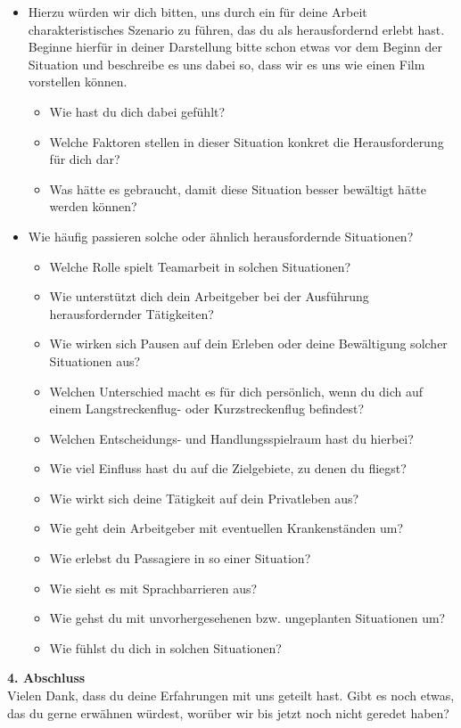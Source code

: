 \documentclass[12pt, a4paper]{article}
\begin{document}
\begin{tcolorbox}[
  breakable,
  colback=gray!10,
  colframe=black,
  arc=10pt,          %
  boxrule=0.5pt,
  left=6pt, right=6pt, top=6pt, bottom=6pt
]
\begin{itemize}
    \item  Hierzu würden wir dich bitten, uns durch ein für deine Arbeit charakteristisches
    Szenario zu führen, das du als herausfordernd erlebt hast. Beginne hierfür in deiner
    Darstellung bitte schon etwas vor dem Beginn der Situation und beschreibe es uns
    dabei so, dass wir es uns wie einen Film vorstellen können.
    \begin{itemize}
        \item Wie hast du dich dabei gefühlt?
        \item Welche Faktoren stellen in dieser Situation konkret die Herausforderung für
        dich dar?
        \item Was hätte es gebraucht, damit diese Situation besser bewältigt hätte werden
        können?
    \end{itemize}
    \item Wie häufig passieren solche oder ähnlich herausfordernde Situationen?
    \begin{itemize}
        \item Welche Rolle spielt Teamarbeit in solchen Situationen?
        \item Wie unterstützt dich dein Arbeitgeber bei der Ausführung herausfordernder
        Tätigkeiten?
        \item Wie wirken sich Pausen auf dein Erleben oder deine Bewältigung solcher
        Situationen aus?
        \item Welchen Unterschied macht es für dich persönlich, wenn du dich auf einem
        Langstreckenflug- oder Kurzstreckenflug befindest?
        \item Welchen Entscheidungs- und Handlungsspielraum hast du hierbei?
        \item Wie viel Einfluss hast du auf die Zielgebiete, zu denen du fliegst?
        \item Wie wirkt sich deine Tätigkeit auf dein Privatleben aus?
        \item Wie geht dein Arbeitgeber mit eventuellen Krankenständen um?
        \item Wie erlebst du Passagiere in so einer Situation?
        \item Wie sieht es mit Sprachbarrieren aus?
        \item Wie gehst du mit unvorhergesehenen bzw. ungeplanten Situationen um?
        \item Wie fühlst du dich in solchen Situationen?
    \end{itemize}
\end{itemize}

\textbf{4. Abschluss} \\

Vielen Dank, dass du deine Erfahrungen mit uns geteilt hast.
Gibt es noch etwas, das du gerne erwähnen würdest, 
worüber wir bis jetzt noch nicht geredet haben?

\end{tcolorbox}
\end{document}
